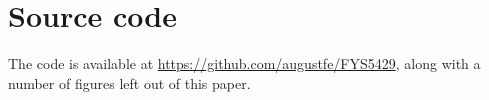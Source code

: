 \section{Source code}
The code is available at \url{https://github.com/augustfe/FYS5429}, along with a number of figures left out of this paper.